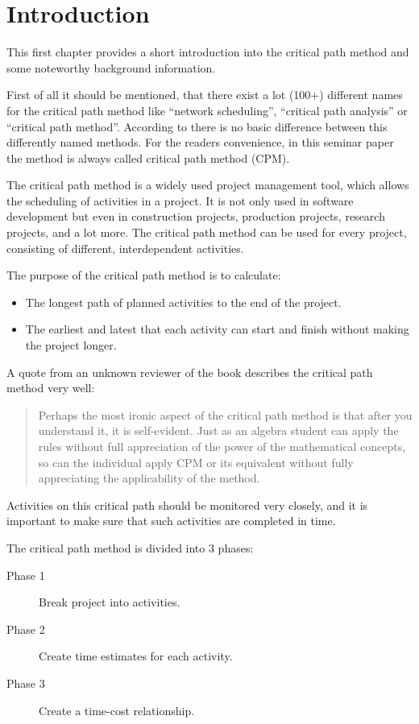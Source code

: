 \section{Introduction}

This first chapter provides a short introduction into the critical path method and some noteworthy
background information.

First of all it should be mentioned, that there exist a lot (100+) different names for  the critical
path method like “network scheduling”, “critical path analysis” or “critical path method”. According
to \cite{dua} there is no basic difference between this differently named methods. For the readers
convenience, in this seminar paper the method is always called critical path method (CPM). 

The critical path method is a widely used project management tool, which allows the scheduling of
activities in a project. It is not only used in software development but even in construction
projects, production projects, research projects, and a lot more. The critical path method can be
used for every project, consisting of different, interdependent activities.  

The purpose of the critical path method is to calculate\cite{santiago}:
\begin{itemize}
  \item The longest path of planned activities to the end of the project.
  \item The earliest and latest that each activity can start and finish without making the project longer.
\end{itemize}

A quote from an unknown reviewer of the book \cite{obrien} describes the critical path
method very well:

\begin{quotation}
Perhaps the most ironic aspect of the critical path method is that after you understand it, it is
self-evident. Just as an algebra student can apply the rules without full appreciation of the power
of the mathematical concepts, so can the individual apply CPM or its equivalent without fully
appreciating the applicability of the method.
\end{quotation}

Activities on this critical path should be monitored very closely, and it is important to make sure
that such activities are completed in time. 

The critical path method is divided into 3 phases:
\begin{description}
  \item[Phase 1] Break project into activities.
  \item[Phase 2] Create time estimates for each activity. 
  \item[Phase 3] Create a time-cost relationship.
\end{description}

